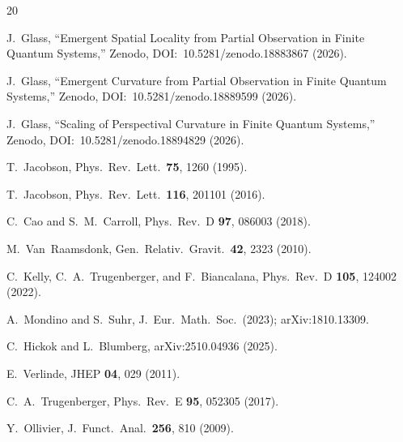 \documentclass[aps,pra,twocolumn,superscriptaddress,floatfix]{revtex4-2}
\begin{document}
\begin{thebibliography}{20}

J.~Glass, ``Emergent Spatial Locality from Partial Observation in Finite Quantum Systems,''
Zenodo, DOI:~10.5281/zenodo.18883867 (2026).

J.~Glass, ``Emergent Curvature from Partial Observation in Finite Quantum Systems,''
Zenodo, DOI:~10.5281/zenodo.18889599 (2026).

J.~Glass, ``Scaling of Perspectival Curvature in Finite Quantum Systems,''
Zenodo, DOI:~10.5281/zenodo.18894829 (2026).

T.~Jacobson,
Phys.\ Rev.\ Lett.\ \textbf{75}, 1260 (1995).

T.~Jacobson,
Phys.\ Rev.\ Lett.\ \textbf{116}, 201101 (2016).

C.~Cao and S.~M.~Carroll,
Phys.\ Rev.\ D \textbf{97}, 086003 (2018).

M.~Van~Raamsdonk,
Gen.\ Relativ.\ Gravit.\ \textbf{42}, 2323 (2010).

C.~Kelly, C.~A.~Trugenberger, and F.~Biancalana,
Phys.\ Rev.\ D \textbf{105}, 124002 (2022).

A.~Mondino and S.~Suhr,
J.\ Eur.\ Math.\ Soc.\ (2023);
arXiv:1810.13309.

C.~Hickok and L.~Blumberg,
arXiv:2510.04936 (2025).

E.~Verlinde,
JHEP \textbf{04}, 029 (2011).

C.~A.~Trugenberger,
Phys.\ Rev.\ E \textbf{95}, 052305 (2017).

Y.~Ollivier,
J.\ Funct.\ Anal.\ \textbf{256}, 810 (2009).

\end{thebibliography}
\end{document}
